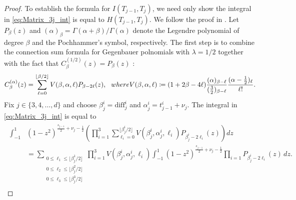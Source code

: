 \documentclass[11pt]{amsart}
\theoremstyle{definition}
\theoremstyle{plain}
\theoremstyle{remark}
\newcommand{\tn}{\textnormal}
\newcommand{\diff}{\mathrm{diff}}
\begin{document}
\begin{proof}
To establish the formula for $I(T_{j - 1}, T_j)$, we need only show the integral in \eqref{eq:Matrix_3j_int} is equal to $H(T_{j - 1}, T_j)$. We follow the proof in \cite[Section V]{wen1985}. Let $P_\beta(z)$ and $(\alpha)_\beta = \Gamma(\alpha + \beta)/\Gamma(\alpha)$ denote the Legendre polynomial of degree $\beta$ and the Pochhammer's symbol, respectively. The first step is to combine the connection sum formula \cite[Eq.~18.18.16]{NIST} for Gegenbauer polnomials with $\lambda = 1/2$ together with the fact that $C_\beta^{(1/2)}(z) = P_\beta(z)$ \cite[Eq.~18.7.8]{NIST}: 
\begin{equation*} 
C_\beta^{(\alpha)}(z) = \sum_{\ell = 0}^{\lfloor \beta/2\rfloor} V(\beta, \alpha, \ell)P_{\beta - 2\ell}(z), \ \ \tn{ where } V(\beta, \alpha, \ell)\coloneqq (1 + 2\beta - 4\ell)\frac{(\alpha)_{\beta - \ell}}{(\frac{3}{2})_{\beta - \ell}}\frac{(\alpha - \frac{1}{2})_\ell}{\ell!}. 
\end{equation*}
Fix $j\in\{3, 4, \dots, d\}$ and choose $\beta_j^i = \diff_j^i$ and $\alpha_j^i = t_{j - 1}^i + \nu_j$. The integral in \eqref{eq:Matrix_3j_int} is equal to 
\begin{gather} \label{eq:Matrix_3j1}
\begin{aligned} 
\int_{-1}^1 & (1 - z^2)^{\frac{s_{j - 1}}{2} + \nu_j - \frac{1}{2}}\left(\prod_{i = 1}^3 \sum_{\ell_i = 0}^{\lfloor \beta_j^i/2\rfloor} V(\beta_j^i, \alpha_j^i, \ell_i)P_{\beta_j^i - 2\ell_i}(z)\right) dz \\ 
& = \sum_{\substack{0\le \ell_1\le \lfloor \beta_j^1/2\rfloor \\ 0\le \ell_2\le \lfloor \beta_j^2/2\rfloor \\ 0\le \ell_3\le \lfloor \beta_j^3/2\rfloor}} \prod_{i = 1}^3 V(\beta_j^i, \alpha_j^i, \ell_i)\int_{-1}^1 (1 - z^2)^{\frac{s_{j - 1}}{2} + \nu_j - \frac{1}{2}} \prod_{i = 1} P_{\beta_j^i - 2\ell_i}(z)\, dz. 
\end{aligned} 
\end{gather} 


\end{proof}
\end{document}
